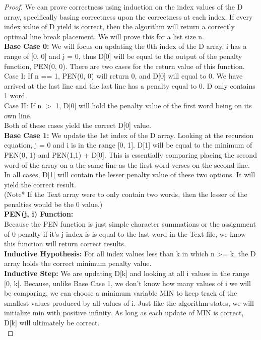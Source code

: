 \documentclass[11pt, solution, letterpaper]{format}
\begin{document}
\begin{proof}We can prove correctness using induction on the index values of the D array, specifically basing correctness upon the correctness at each index. If every index value of D yield is correct, then the algorithm will return a correctly optimal line break placement. We will prove this for a list size n. \\

\textbf{Base Case 0:} We will focus on updating the 0th index of the D array. i has a range of [0, 0] and j = 0, thus D[0] will be equal to the output of the penalty function, PEN(0, 0). There are two cases for the return value of this function.\\ 
Case I: If n == 1, PEN(0, 0) will return 0, and D[0] will equal to 0. We have arrived at the last line and the last line has a penalty equal to 0. D only contains 1 word.\\ 

Case II: If n $>$ 1, D[0] will hold the penalty value of the first word being on its own line. \\

Both of these cases yield the correct D[0] value.\\

\textbf{Base Case 1:} We update the 1st index of the D array. Looking at the recursion equation, j = 0 and i is in the range [0, 1]. D[1] will be equal to the minimum of PEN(0, 1) and PEN(1,1) + D[0]. This is essentially comparing placing the second word of the array on a the same line as the first word verses on the second line.  In all cases, D[1] will contain the lesser penalty value of these two options. It will yield the correct result.\\

(Note* If the Text array were to only contain two words, then the lesser of the penalties would be the 0 value.)\\

\textbf{PEN(j, i) Function:}\\
Because the PEN function is just simple character summations or the assignment of 0 penalty if it's j index is is equal to the last word in the Text file, we know this function will return correct results. \\

\textbf{Inductive Hypothesis:} For all index values less than k in which n >= k, the D array holds the correct minimum penalty value.\\

\textbf{Inductive Step: }
We are updating D[k] and looking at all i values in the range [0, k]. 
Because, unlike Base Case 1, we don't know how many values of i we will be comparing, we can choose a minimum variable MIN to keep track of the smallest values produced by all values of i. Just like the algorithm states, we will initialize min with positive infinity. As long as each update of MIN is correct, D[k] will ultimately be correct. \\


\end{proof}
\end{document}
